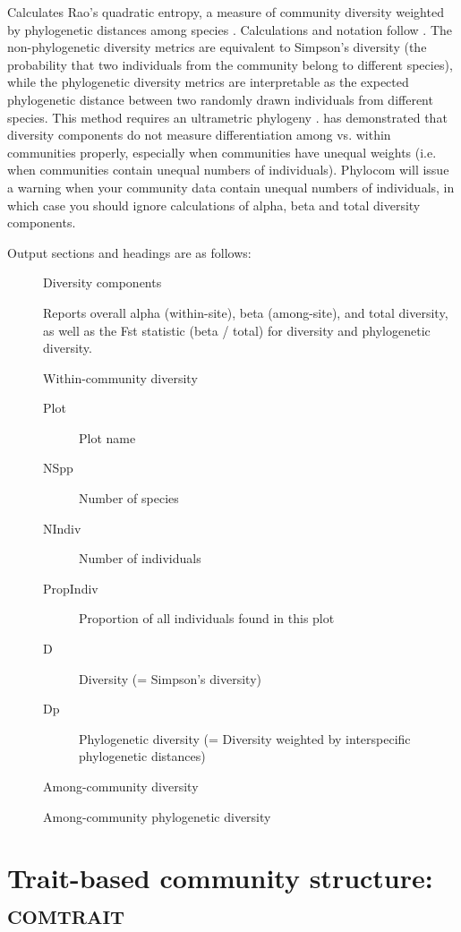 \documentclass[12pt,letterpaper]{article}
\begin{document}
Calculates Rao's quadratic entropy, a measure of community diversity
weighted by phylogenetic distances among species
\citep{rao1982dad}. Calculations and notation follow
\citet{champely2002mbd}. The non-phylogenetic diversity metrics are
equivalent to Simpson's diversity (the probability that two
individuals from the community belong to different species), while the
phylogenetic diversity metrics are interpretable as the expected
phylogenetic distance between two randomly drawn individuals from different species.
This method requires an ultrametric phylogeny \citep{pavoine2005mdd}. 
\citet{jost2007pdi} has demonstrated that diversity components do not measure differentiation among vs.
within communities properly, especially when
communities have unequal weights (i.e. when communities contain unequal numbers
of individuals). Phylocom will
issue a warning when your community data contain unequal numbers of
individuals, in which case you should ignore calculations of alpha, beta
and total diversity components.

Output sections and headings are as follows:

\begin{description}
  \item[] Diversity components

    Reports overall alpha (within-site), beta (among-site), and total
    diversity, as well as the Fst statistic (beta / total) for
    diversity and phylogenetic diversity.

  \item[] Within-community diversity
    \begin{description}
      \item[Plot] Plot name
      \item[NSpp] Number of species
      \item[NIndiv] Number of individuals
      \item[PropIndiv] Proportion of all individuals found in this plot
      \item[D] Diversity (= Simpson's diversity)
      \item[Dp] Phylogenetic diversity (= Diversity weighted by interspecific phylogenetic distances)
    \end{description}
  \item[] Among-community diversity
  \item[] Among-community phylogenetic diversity
\end{description}

\section{Trait-based community structure: {\scshape comtrait}}
\end{document}
